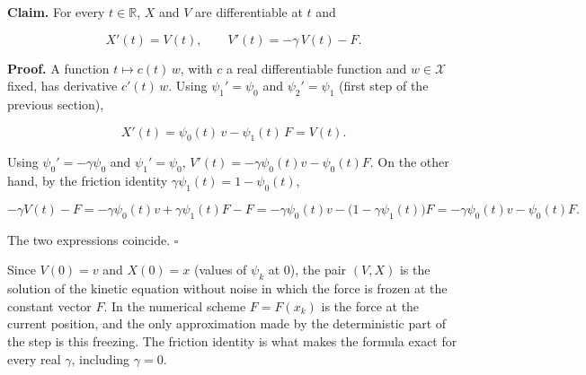 \documentclass[11pt,a4paper]{article}
\begin{document}
\textbf{Claim.} For every \(t\in\mathbb R\), \(X\) and \(V\) are differentiable at \(t\) and


\[X'(t)=V(t),\qquad V'(t)=-\gamma\,V(t)-F .\]


\textbf{Proof.} A function \(t\mapsto c(t)\,w\), with \(c\) a real differentiable function and \(w\in\mathcal X\) fixed, has derivative \(c'(t)\,w\). Using \(\psi_1'=\psi_0\) and \(\psi_2'=\psi_1\) (first step of the previous section),


\[X'(t)=\psi_0(t)\,v-\psi_1(t)\,F=V(t).\]


Using \(\psi_0'=-\gamma\psi_0\) and \(\psi_1'=\psi_0\), \(V'(t)=-\gamma\psi_0(t)v-\psi_0(t)F\). On the other hand, by the friction identity \(\gamma\psi_1(t)=1-\psi_0(t)\),


\[-\gamma V(t)-F=-\gamma\psi_0(t)v+\gamma\psi_1(t)F-F=-\gamma\psi_0(t)v-\bigl(1-\gamma\psi_1(t)\bigr)F=-\gamma\psi_0(t)v-\psi_0(t)F .\]


The two expressions coincide. \(\square\)




Since \(V(0)=v\) and \(X(0)=x\) (values of \(\psi_k\) at \(0\)), the pair \((V,X)\) is the solution of the kinetic equation without noise in which the force is frozen at the constant vector \(F\). In the numerical scheme \(F=F(x_k)\) is the force at the current position, and the only approximation made by the deterministic part of the step is this freezing. The friction identity is what makes the formula exact for every real \(\gamma\), including \(\gamma=0\).
\end{document}
